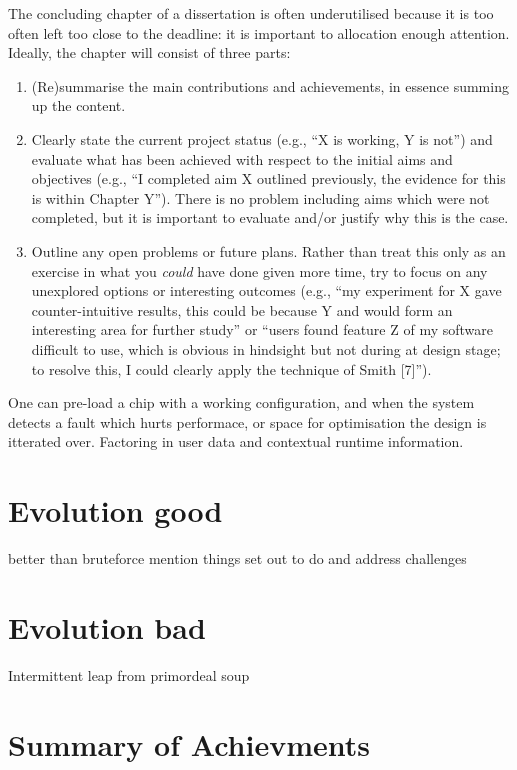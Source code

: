 \noindent
{
	\color{red}
The concluding chapter of a dissertation is often underutilised because it
is too often left too close to the deadline: it is important to allocation
enough attention.  Ideally, the chapter will consist of three parts:

\begin{enumerate}
\item (Re)summarise the main contributions and achievements, in essence
      summing up the content.
\item Clearly state the current project status (e.g., ``X is working, Y
      is not'') and evaluate what has been achieved with respect to the
      initial aims and objectives (e.g., ``I completed aim X outlined
      previously, the evidence for this is within Chapter Y'').  There
      is no problem including aims which were not completed, but it is
      important to evaluate and/or justify why this is the case.
\item Outline any open problems or future plans.  Rather than treat this
      only as an exercise in what you {\em could} have done given more
      time, try to focus on any unexplored options or interesting outcomes
      (e.g., ``my experiment for X gave counter-intuitive results, this
      could be because Y and would form an interesting area for further
      study'' or ``users found feature Z of my software difficult to use,
      which is obvious in hindsight but not during at design stage; to
      resolve this, I could clearly apply the technique of Smith [7]'').
\end{enumerate}
}

One can pre-load a chip with a working configuration, and when the system detects a fault which hurts performace, or space for optimisation the design is itterated over. Factoring in user data and contextual runtime information.

\section{Evolution good}
better than bruteforce
mention things set out to do and address challenges

\section{Evolution bad}
Intermittent leap from primordeal soup

\section{Summary of Achievments}

